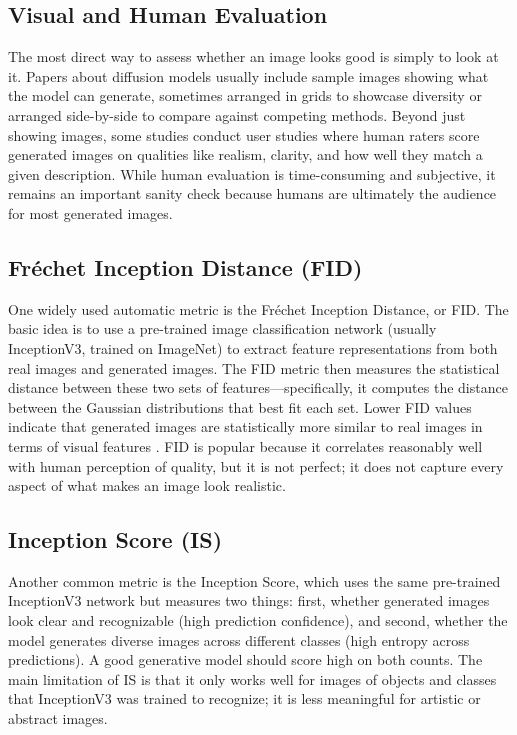 \documentclass[a4paper,12pt]{article}
\begin{document}
\subsection{Visual and Human Evaluation}
The most direct way to assess whether an image looks good is simply to look at it. Papers about diffusion models usually include sample images showing what the model can generate, sometimes arranged in grids to showcase diversity or arranged side-by-side to compare against competing methods. Beyond just showing images, some studies conduct user studies where human raters score generated images on qualities like realism, clarity, and how well they match a given description. While human evaluation is time-consuming and subjective, it remains an important sanity check because humans are ultimately the audience for most generated images.

\subsection{Fréchet Inception Distance (FID)}
One widely used automatic metric is the Fréchet Inception Distance, or FID. The basic idea is to use a pre-trained image classification network (usually InceptionV3, trained on ImageNet) to extract feature representations from both real images and generated images. The FID metric then measures the statistical distance between these two sets of features---specifically, it computes the distance between the Gaussian distributions that best fit each set. Lower FID values indicate that generated images are statistically more similar to real images in terms of visual features \cite{heusel2017fid}. FID is popular because it correlates reasonably well with human perception of quality, but it is not perfect; it does not capture every aspect of what makes an image look realistic.

\subsection{Inception Score (IS)}
Another common metric is the Inception Score, which uses the same pre-trained InceptionV3 network but measures two things: first, whether generated images look clear and recognizable (high prediction confidence), and second, whether the model generates diverse images across different classes (high entropy across predictions). A good generative model should score high on both counts. The main limitation of IS is that it only works well for images of objects and classes that InceptionV3 was trained to recognize; it is less meaningful for artistic or abstract images.
\end{document}
